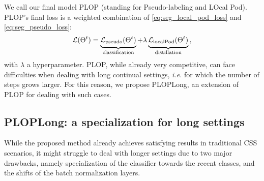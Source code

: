 We call our final model PLOP (standing for Pseudo-labeling and LOcal Pod). PLOP's final loss is a
weighted combination of \autoref{eq:seg_local_pod_loss} and \autoref{eq:seg_pseudo_loss}:
%
\begin{equation}
    \mathcal{L}(\Theta^t) = \underbrace{\strut \mathcal{L}_\text{pseudo}(\Theta^t)}_\text{classification} + \lambda\underbrace{\strut \mathcal{L}_\text{localPod}(\Theta^t)}_\text{distillation}\,,
    \label{eq:seg_complete_loss}
\end{equation}
%
\noindent with $\lambda$ a hyperparameter. PLOP, while already very competitive, can face difficulties when
dealing with long continual settings, \textit{i.e.} for which the number of steps grows larger. For
this reason, we propose PLOPLong, an extension of PLOP for dealing with such cases.

\subsection{PLOPLong: a specialization for long settings}\label{sec:seg_plopv2}

While the proposed method already achieves satisfying results in traditional \ac{CSS} scenarios, it might
struggle to deal with longer settings due to two major drawbacks, namely specialization of the
classifier towards the recent classes, and the shifts of the batch normalization layers.

